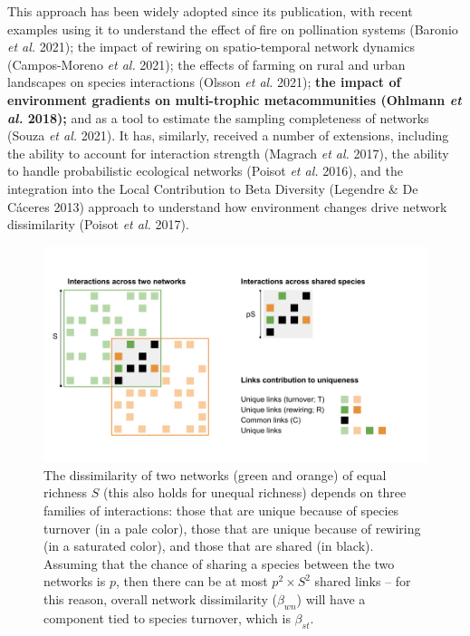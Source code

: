 \documentclass[11pt]{article}
\makeatletter
\def\maxwidth{\ifdim\Gin@nat@width>\linewidth\linewidth
\else\Gin@nat@width\fi}
\let\Oldincludegraphics\includegraphics
\renewcommand{\includegraphics}[1]{\Oldincludegraphics[width=\maxwidth]{#1}}
\providecommand{\DIFaddtex}[1]{{\bf #1}} %
\providecommand{\DIFdeltex}[1]{} %
\providecommand{\DIFaddbegin}{\protect\color{blue}} %
\providecommand{\DIFaddend}{\protect\color{black}} %
\providecommand{\DIFdelbegin}{\protect\color{red}} %
\providecommand{\DIFdelend}{\protect\color{black}} %
\providecommand{\DIFadd}[1]{\texorpdfstring{\DIFaddtex{#1}}{#1}} %
\providecommand{\DIFdel}[1]{\texorpdfstring{\DIFdeltex{#1}}{}} %
\newcommand{\DIFscaledelfig}{0.5}
\newlength{\DIFdelgraphicswidth} %
\newlength{\DIFdelgraphicsheight} %
\newcommand{\DIFaddincludegraphics}[2][]{{\color{blue}\fbox{\DIFOincludegraphics[#1]{#2}}}} %
\newcommand{\DIFdelincludegraphics}[2][]{%
\sbox{\DIFdelgraphicsbox}{\DIFOincludegraphics[#1]{#2}}%
\settoboxwidth{\DIFdelgraphicswidth}{\DIFdelgraphicsbox} %
\settoboxtotalheight{\DIFdelgraphicsheight}{\DIFdelgraphicsbox} %
\scalebox{\DIFscaledelfig}{%
\parbox[b]{\DIFdelgraphicswidth}{\usebox{\DIFdelgraphicsbox}\\[-\baselineskip] \rule{\DIFdelgraphicswidth}{0em}}\llap{\resizebox{\DIFdelgraphicswidth}{\DIFdelgraphicsheight}{%
\setlength{\unitlength}{\DIFdelgraphicswidth}%
\begin{picture}(1,1)%
\thicklines\linethickness{2pt} %
{\color[rgb]{1,0,0}\put(0,0){\framebox(1,1){}}}%
{\color[rgb]{1,0,0}\put(0,0){\line( 1,1){1}}}%
{\color[rgb]{1,0,0}\put(0,1){\line(1,-1){1}}}%
\end{picture}%
}\hspace*{3pt}}} %
} %
\DeclareRobustCommand{\DIFaddbegin}{\DIFOaddbegin \let\includegraphics\DIFaddincludegraphics} %
\DeclareRobustCommand{\DIFaddend}{\DIFOaddend \let\includegraphics\DIFOincludegraphics} %
\DeclareRobustCommand{\DIFdelbegin}{\DIFOdelbegin \let\includegraphics\DIFdelincludegraphics} %
\DeclareRobustCommand{\DIFdelend}{\DIFOaddend \let\includegraphics\DIFOincludegraphics} %
\makeatother
\begin{document}
\DIFaddend This approach has been widely adopted since its publication, with recent
examples using it to understand the effect of fire on pollination
systems (Baronio \emph{et al.} 2021); the impact of rewiring on
spatio-temporal network dynamics (Campos-Moreno \emph{et al.} 2021); the
effects of farming on rural and urban landscapes on species interactions
(Olsson \emph{et al.} 2021); \DIFaddbegin \DIFadd{the impact of environment gradients on
multi-trophic metacommunities (Ohlmann \emph{et al.} 2018); }\DIFaddend and as a
tool to estimate the sampling completeness of networks (Souza \emph{et
al.} 2021). It has, similarly, received a number of extensions,
including the ability to account for interaction strength (Magrach
\emph{et al.} 2017), the ability to handle probabilistic ecological
networks (Poisot \emph{et al.} 2016), and the integration into the Local
Contribution to Beta Diversity (Legendre \& De Cáceres 2013) approach to
understand how environment changes drive network dissimilarity (Poisot
\emph{et al.} 2017).

\DIFdelbegin \DIFdel{In a recent contribution, Fründ (}\DIFdelend \DIFaddbegin 
\begin{figure}
\hypertarget{fig:conceptual}{%
\centering
\includegraphics{figures/betadiv_response_figure.png}
\caption{The dissimilarity of two networks (green and orange) of equal
richness \(S\) (this also holds for unequal richness) depends on three
families of interactions: those that are unique because of species
turnover (in a pale color), those that are unique because of rewiring
(in a saturated color), and those that are shared (in black). Assuming
that the chance of sharing a species between the two networks is \(p\),
then there can be at most \(p^2\times S^2\) shared links -- for this
reason, overall network dissimilarity (\(\beta_{wn}\)) will have a
component tied to species turnover, which is
\(\beta_{st}\).}\label{fig:conceptual}
}

\end{figure}
\end{document}
